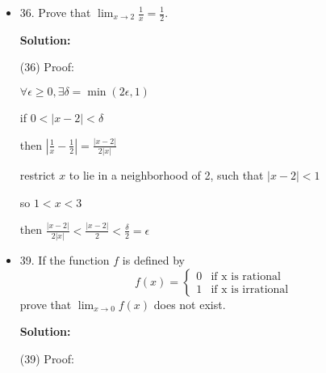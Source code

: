 \documentclass{article}
\newenvironment{solution}{
    \par \textbf{Solution: } \quad \par
}{\par}
\begin{document}
\begin{itemize}
\begin{solution}
            then $|\frac{x^2 + x - 6}{x - 2} - 5| = |\frac{x^2 - 4x - 4}{x - 2}| = |x - 2| < \delta = \epsilon$

            (29) Proof:

            $\forall \epsilon \ge 0, \exists \delta = \sqrt{\epsilon}$

            if $0 < |x - 2| < \delta$

            then $|x^2 - 4x + 5 - 1| = |(x - 2) ^ 2| = |x - 2| ^ 2 < \delta ^2 = \epsilon$

            (32) Proof:

            $\forall \epsilon \ge 0, \exists \delta = \min(\frac{\epsilon}{19}, 1)$
            
            if $0 < |x - 2| < \delta$

            then $|x^3 - 8| = |x - 2||x^2 + 2x + 4| < |x^2 + 2x + 4|\delta$

            restrict $x$ to lie in a neighborhood of 2, such that $|x - 2| < 1$

            so $1 < x < 3$

            then $|x^3 - 8| < |(x + 1)^2 + 3| \delta < 19\delta = \epsilon$
        \end{solution}
        \item 36. Prove that $\lim_{x\to 2} \frac{1}{x} = \frac{1}{2}$.
        \begin{solution}
            (36) Proof:

            $\forall \epsilon \ge 0, \exists \delta = \min(2\epsilon, 1)$

            if $0 < |x - 2| < \delta$

            then $|\frac{1}{x} - \frac{1}{2}| = \frac{|x - 2|}{2|x|}$

            restrict $x$ to lie in a neighborhood of 2, such that $|x - 2| < 1$

            so $1 < x < 3$

            then $\frac{|x-2|}{2|x|} < \frac{|x - 2|}{2} < \frac{\delta}{2} = \epsilon$


        \end{solution}
        \item 39. If the function $f$ is defined by $$f(x) = \left\{ \begin{array}{ll} 0 & \textrm{if x is rational} \\ 1 & \textrm{if x is irrational} \end{array} \right.$$ prove that $\lim_{x\to 0} f(x)$ does not exist.
        \begin{solution}
            (39) Proof:


\end{solution}
\end{itemize}
\end{document}
